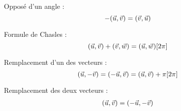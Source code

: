 Opposé d'un angle :
\begin{equation}
-(\vec{u}, \vec{v}) = (\vec{v}, \vec{u})
\label{eq:oppose}
\end{equation}

Formule de Chasles :
\begin{equation}
(\vec{u}, \vec{v}) + (\vec{v}, \vec{w}) = (\vec{u}, \vec{w}) [2\pi]
\label{eq:chasles}
\end{equation}

Remplacement d'un des vecteurs :
\begin{equation}
(\vec{u}, -\vec{v}) = (-\vec{u}, \vec{v}) = (\vec{u}, \vec{v}) + \pi [2\pi]
\end{equation}

Remplacement des deux vecteurs :
\begin{eqnarray}
(\vec{u}, \vec{v}) = (-\vec{u}, -\vec{v})
\label{eq:opposes2}
\end{eqnarray}